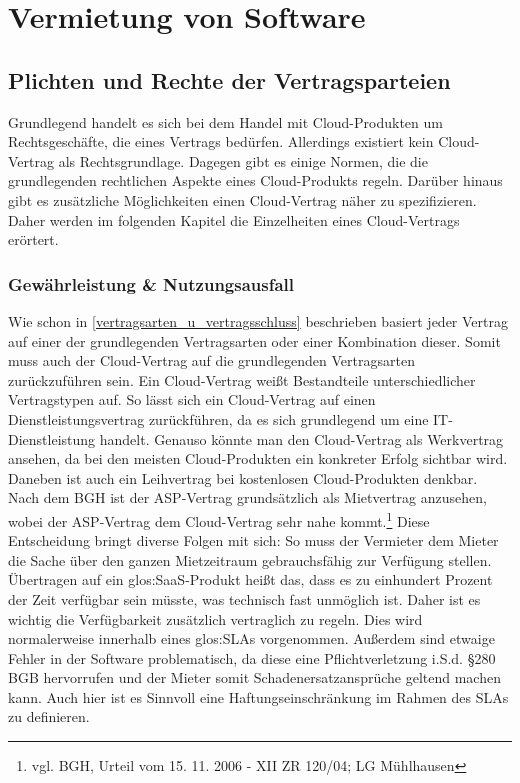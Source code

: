\chapter{Vermietung von Software}
\section{Plichten und Rechte der Vertragsparteien}
Grundlegend handelt es sich bei dem Handel mit Cloud-Produkten um Rechtsgesch\"afte, die eines Vertrags bed\"urfen. Allerdings existiert kein {\glqq}Cloud-Vertrag{\grqq} als Rechtsgrundlage. Dagegen gibt es einige Normen, die die grundlegenden rechtlichen Aspekte eines Cloud-Produkts regeln. Dar\"uber hinaus gibt es zus\"atzliche M\"oglichkeiten einen {\glqq}Cloud-Vertrag{\grqq} n\"aher zu spezifizieren. Daher werden im folgenden Kapitel die Einzelheiten eines {\glqq}Cloud-Vertrags{\grqq} er\"ortert.

  \subsection{Gew\"ahrleistung \& Nutzungsausfall}
Wie schon in \vref{vertragsarten_u_vertragsschluss} beschrieben basiert jeder Vertrag auf einer der grundlegenden Vertragsarten oder einer Kombination dieser. Somit muss auch der {\glqq}Cloud-Vertrag{\grqq} auf die grundlegenden Vertragsarten zur\"uckzuf\"uhren sein.  Ein {\glqq}Cloud-Vertrag{\grqq} wei{\ss}t Bestandteile unterschiedlicher Vertragstypen auf. So l\"asst sich ein {\glqq}Cloud-Vertrag{\grqq} auf einen Dienstleistungsvertrag zur\"uckf\"uhren, da es sich grundlegend um eine IT-Dienstleistung handelt. Genauso k\"onnte man den {\glqq}Cloud-Vertrag{\grqq} als Werkvertrag ansehen, da bei den meisten Cloud-Produkten ein konkreter Erfolg sichtbar wird. Daneben ist auch ein Leihvertrag bei kostenlosen Cloud-Produkten denkbar. Nach dem BGH ist der ASP-Vertrag grunds\"atzlich als Mietvertrag anzusehen, wobei der ASP-Vertrag dem {\glqq}Cloud-Vertrag{\grqq} sehr nahe kommt.\footnote{vgl. BGH, Urteil vom 15. 11. 2006 - XII ZR 120/04; LG M\"uhlhausen} 
Diese Entscheidung bringt diverse Folgen mit sich:\newline
So muss der Vermieter dem Mieter die Sache \"uber den ganzen Mietzeitraum gebrauchsf\"ahig zur Verf\"ugung stellen. \"Ubertragen auf ein \gls{glos:SaaS}-Produkt hei{\ss}t das, dass es zu einhundert Prozent der Zeit verf\"ugbar sein m\"usste, was technisch fast unm\"oglich ist. Daher ist es wichtig die Verf\"ugbarkeit zus\"atzlich vertraglich zu regeln. Dies wird normalerweise innerhalb eines \gls{glos:SLA}s vorgenommen. Au{\ss}erdem sind etwaige Fehler in der Software problematisch, da diese eine Pflichtverletzung i.S.d. §280 BGB hervorrufen und der Mieter somit Schadenersatzanspr\"uche geltend machen kann. Auch hier ist es Sinnvoll eine Haftungseinschr\"ankung im Rahmen des SLAs zu definieren.
